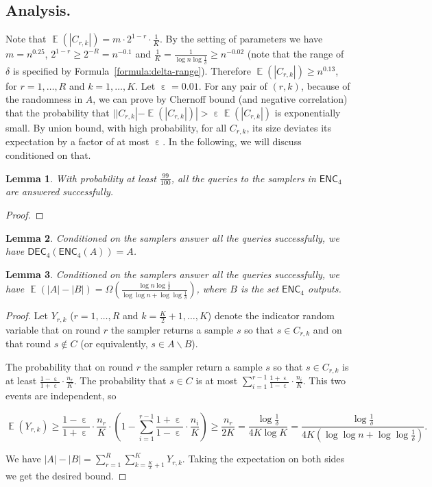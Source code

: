 \documentclass[10pt]{article}
\DeclareMathOperator*{\E}{\mathbb{E}}
\DeclareMathOperator*{\eps}{\varepsilon}
\newtheorem{lemma}{Lemma}
\newcommand{\enc}{\textsf{ENC}\xspace}
\newcommand{\dec}{\textsf{DEC}\xspace}
\begin{document}
\subsection{Analysis.} 

Note that $\E(|C_{r,k}|)=m\cdot 2^{1-r}\cdot \frac{1}{K}$. By the setting of parameters we have $m=n^{0.25}$, $2^{1-r}\ge 2^{-R}=n^{-0.1}$ and $\frac{1}{K}=\frac{1}{\log n \log \frac{1}{\delta}}\ge n^{-0.02}$ (note that the range of $\delta$ is specified by Formula~\ref{formula:delta-range}). Therefore $\E(|C_{r,k}|) \ge n^{0.13}$, for $r=1,\ldots, R$ and $k=1,\ldots, K$. Let $\eps=0.01$. For any pair of $(r,k)$, because of the randomness in $A$, we can prove by Chernoff bound (and negative correlation) that the probability that $||C_{r,k}|-\E(|C_{r,k}|)|>\eps \E(|C_{r,k}|)$ is exponentially small. By union bound, with high probability, for all $C_{r,k}$, its size deviates its expectation by a factor of at most $\eps$. In the following, we will discuss conditioned on that.

\begin{lemma}
  With probability at least $\frac{99}{100}$, all the queries to the samplers in $\enc_4$ are answered successfully. 
\end{lemma}

\begin{proof}
  
\end{proof}

\begin{lemma}
  Conditioned on the samplers answer all the queries successfully, we have $\dec_4(\enc_4(A))=A$.
\end{lemma}

\begin{lemma}
  Conditioned on the samplers answer all the queries successfully, we have $\E(|A|-|B|)=\Omega(\frac{\log n \log \frac{1}{\delta}}{\log\log n + \log\log \frac{1}{\delta}})$, where $B$ is the set $\enc_4$ outputs.
\end{lemma}

\begin{proof}
  Let $Y_{r,k}$ ($r=1,\ldots, R$ and $k=\frac{K}{2}+1,\ldots, K$) denote the indicator random variable that on round $r$ the sampler returns a sample $s$ so that $s\in C_{r,k}$ and on that round $s\not\in C$ (or equivalently, $s\in A\backslash B$).  
  
  The probability that on round $r$ the sampler return a sample $s$ so that $s\in C_{r,k}$ is at least $\frac{1-\eps}{1+\eps}\cdot \frac{n_r}{K}$. The probability that $s\in C$ is at most $\sum_{i=1}^{r-1}{\frac{1+\eps}{1-\eps}\cdot \frac{n_i}{K}}$. This two events are independent, so 
  
  $$\E(Y_{r,k})\ge \frac{1-\eps}{1+\eps}\cdot \frac{n_r}{K} \cdot (1-\sum_{i=1}^{r-1}{\frac{1+\eps}{1-\eps}\cdot \frac{n_i}{K}}) \ge \frac{n_r}{2K}=\frac{\log \frac{1}{\delta}}{4K\log K}=\frac{\log \frac{1}{\delta}}{4K(\log\log n + \log\log \frac{1}{\delta})}.$$
  
   We have $|A|-|B|=\sum_{r=1}^{R}{\sum_{k=\frac{K}{2}+1}^{K}{Y_{r,k}}}$. Taking the expectation on both sides we get the desired bound.
  
\end{proof}
\end{document}
